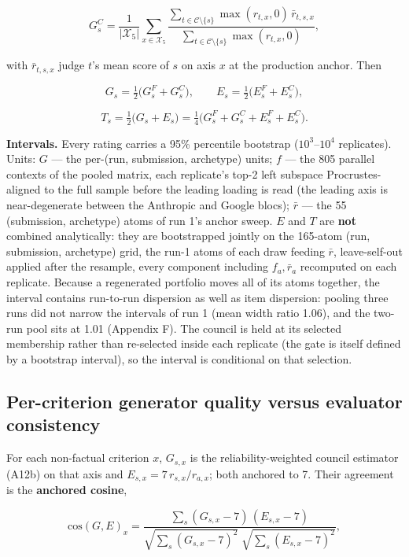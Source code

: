 \documentclass{article}
\begin{document}
\[ G^{C}_s=\frac{1}{|\mathcal{X}_{5}|}\sum_{x\in\mathcal{X}_{5}}\frac{\sum_{t\in\mathcal{C}\setminus\{s\}}\max(r_{t,x},0)\,\bar r_{t,s,x}}{\sum_{t\in\mathcal{C}\setminus\{s\}}\max(r_{t,x},0)}, \tag{A12b}\]

with \(\bar r_{t,s,x}\) judge \(t\)'s mean score of \(s\) on axis \(x\) at the production anchor. Then

\[ G_s=\tfrac12\big(G^{F}_s+G^{C}_s\big),\qquad E_s=\tfrac12\big(E^{F}_s+E^{C}_s\big), \tag{A13}\]

\[ T_s=\tfrac12\big(G_s+E_s\big)=\tfrac14\big(G^{F}_s+G^{C}_s+E^{F}_s+E^{C}_s\big). \tag{A14}\]

\textbf{Intervals.} Every rating carries a 95\% percentile bootstrap (\(10^3\)--\(10^4\) replicates). Units: \(G\) --- the per-(run, submission, archetype) units; \(f\) --- the 805 parallel contexts of the pooled matrix, each replicate's top-2 left subspace Procrustes-aligned to the full sample before the leading loading is read (the leading axis is near-degenerate between the Anthropic and Google blocs); \(\bar r\) --- the 55 (submission, archetype) atoms of run 1's anchor sweep. \(E\) and \(T\) are \textbf{not} combined analytically: they are bootstrapped jointly on the 165-atom (run, submission, archetype) grid, the run-1 atoms of each draw feeding \(\bar r\), leave-self-out applied after the resample, every component including \(f_a,\bar r_a\) recomputed on each replicate. Because a regenerated portfolio moves all of its atoms together, the interval contains run-to-run dispersion as well as item dispersion: pooling three runs did not narrow the intervals of run 1 (mean width ratio 1.06), and the two-run pool sits at 1.01 (Appendix F). The council is held at its selected membership rather than re-selected inside each replicate (the gate is itself defined by a bootstrap interval), so the interval is conditional on that selection.

\subsection{Per-criterion generator quality versus evaluator consistency}\label{per-criterion-generator-quality-versus-evaluator-consistency}

For each non-factual criterion \(x\), \(G_{s,x}\) is the reliability-weighted council estimator (A12b) on that axis and \(E_{s,x}=7\,r_{s,x}/r_{a,x}\); both anchored to 7. Their agreement is the \textbf{anchored cosine},

\[ \mathrm{cos}(G,E)_x=\frac{\sum_{s}(G_{s,x}-7)\,(E_{s,x}-7)}{\sqrt{\sum_{s}(G_{s,x}-7)^2}\;\sqrt{\sum_{s}(E_{s,x}-7)^2}}, \tag{A15}\]
\end{document}
